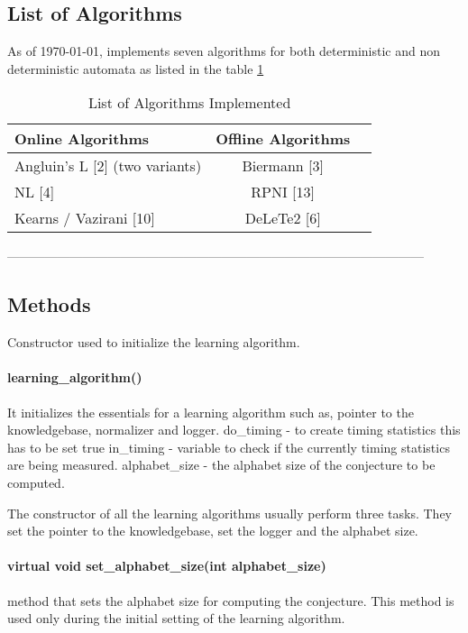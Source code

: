 \subsection{List of Algorithms}

As of \today, \libalf implements seven algorithms for both deterministic and non deterministic automata as listed in the table \ref{algtables1}

\begin{table} [h]
\centering
\begin{tabular}[c]{lcr}
\toprule[1pt]
Online Algorithms & Offline Algorithms \\	
\midrule
Angluin's L [2] (two variants) & Biermann [3] \\
NL [4] & RPNI [13] \\
Kearns / Vazirani [10] & DeLeTe2 [6]\\
\bottomrule[1pt]
\end{tabular}
\caption{List of Algorithms Implemented}
\label{algtables1}
\end{table}

---------------------------------------------------------------------------------------------------

\subsection{Methods}

Constructor used to initialize the learning algorithm. \vskip 1pt

\paragraph{learning\_algorithm()}
It initializes the essentials for a learning algorithm such as, pointer to the knowledgebase, normalizer and logger. 
do\_timing - to create timing statistics this has to be set true
in\_timing - variable to check if the currently timing statistics are being measured.
alphabet\_size - the alphabet size of the conjecture to be computed.


The constructor of all the learning algorithms usually perform three tasks. They set the pointer to the knowledgebase, set the logger and the alphabet size. 

\paragraph{virtual void set\_alphabet\_size(int alphabet\_size)}
method that sets the alphabet size for computing the conjecture. This method is used only during the initial setting of the learning algorithm. 

